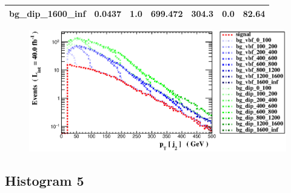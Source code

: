 \documentclass[a4paper, 10pt]{article}
\begin{document}
\begin{table}[H]
\begin{center}
\begin{tabular}{|m{23.0mm}|m{23.0mm}|m{18.0mm}|m{19.0mm}|m{19.0mm}|m{19.0mm}|m{19.0mm}|}
      \hline
      {\cellcolor{white}         bg\_dip\_1600\_inf}& {\cellcolor{white}         0.0437}& {\cellcolor{white}         1.0}& {\cellcolor{white}         699.472}& {\cellcolor{white}         304.3}& {\cellcolor{red}         0.0}& {\cellcolor{red}         82.64}\\
\hline
    \end{tabular}
  \end{center}
\end{table}

\begin{figure}[H]
  \begin{center}
    \includegraphics[scale=0.45]{selection_3.eps}\\
\caption{   }
  \end{center}
\end{figure}
      \newpage
\subsection{ Histogram 5}
\end{document}
